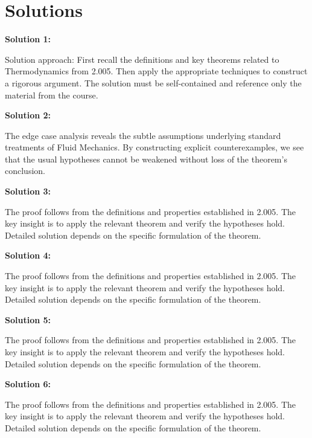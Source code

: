 \documentclass[12pt,a4paper]{exam}
\begin{document}
\newpage
\section*{Solutions}

\textbf{Solution 1:}

Solution approach: First recall the definitions and key theorems related to Thermodynamics from 2.005. Then apply the appropriate techniques to construct a rigorous argument. The solution must be self-contained and reference only the material from the course.

\vspace{0.5cm}

\textbf{Solution 2:}

The edge case analysis reveals the subtle assumptions underlying standard treatments of Fluid Mechanics. By constructing explicit counterexamples, we see that the usual hypotheses cannot be weakened without loss of the theorem's conclusion.

\vspace{0.5cm}

\textbf{Solution 3:}

The proof follows from the definitions and properties established in 2.005. The key insight is to apply the relevant theorem and verify the hypotheses hold. Detailed solution depends on the specific formulation of the theorem.

\vspace{0.5cm}

\textbf{Solution 4:}

The proof follows from the definitions and properties established in 2.005. The key insight is to apply the relevant theorem and verify the hypotheses hold. Detailed solution depends on the specific formulation of the theorem.

\vspace{0.5cm}

\textbf{Solution 5:}

The proof follows from the definitions and properties established in 2.005. The key insight is to apply the relevant theorem and verify the hypotheses hold. Detailed solution depends on the specific formulation of the theorem.

\vspace{0.5cm}

\textbf{Solution 6:}

The proof follows from the definitions and properties established in 2.005. The key insight is to apply the relevant theorem and verify the hypotheses hold. Detailed solution depends on the specific formulation of the theorem.
\end{document}
